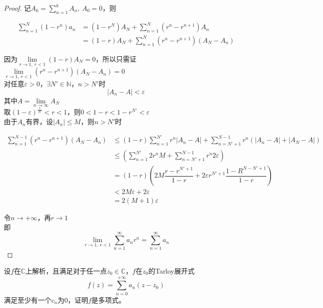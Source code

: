 \begin{proof}
    
    记$A_k = \sum\limits_{n = 1}^{k}{A_n},\ A_0 = 0$，则

    \begin{align*}
        \sum\limits_{n=1}^{N}{(1-r^n)a_n} & = (1-r^N)A_N + \sum\limits_{n=1}^{N}{(r^n-r^{n+1})A_n}\\
        & = (1 - r)A_N + \sum\limits_{n=1}^{N}{(r^n-r^{n+1})(A_N - A_n)}
    \end{align*}

    因为$\lim\limits_{r \to 1,\ r < 1}{(1 - r)A_N} = 0$，所以只需证$\lim\limits_{r \to 1,\ r < 1}{(r^n-r^{n+1})(A_N - A_n)} = 0$\\
    对任意$\varepsilon > 0 $，$\exists N' \in \mathbb{N}$，$n > N'$时
    $$|A_n - A| < \varepsilon $$
    其中$A = \lim\limits_{n\to\infty}{A_N}$\\
    取$(1-\varepsilon)^{\frac{1}{N'}} < r < 1$，则$0 < 1 - r < 1 - r^{N'} < \varepsilon $\\
    由于$A_n$有界，设$|A_n| \leq M $，则$n > N'$时
    
    \begin{align*}
        \sum\limits_{n=1}^{N-1}{(r^n - r^{n+1})(A_N - A_n)} & \leq (1 - r)\sum\limits_{n=1}^{N'}{r^n|A_n - A|} + \sum\limits_{n=N'+1}^{N-1}{r^n(|A_n - A| + |A_N -A|)}\\
        & \leq (\sum\limits_{n=1}^{N'}{2r^nM} + \sum\limits_{n=N'+1}^{N-1}{r^n2\varepsilon})\\
        & = (1 - r)\left(2M\dfrac{r - r^{N'+1}}{1 - r} + 2\varepsilon r^{N'+1}\dfrac{1 - R^{N-N'+1}}{1 - r}\right)\\
        & < 2M\varepsilon + 2\varepsilon\\
        & = 2(M+1)\varepsilon
    \end{align*}

    令$n\to+\infty$，再$r\to1$\\
    即
    $$\lim\limits_{r \to 1,\ r < 1}{\sum\limits_{n=1}^{\infty}{a_nr^n}} = \sum\limits_{n=1}^{\infty}{a_n}$$

\end{proof}

\begin{proposition}
    
    设$f$在$\mathbb{C}$上解析，且满足对于任一点$z_0\in\mathbb{C}$，$f$在$z_0$的\textup{Tarloy}展开式
    $$f(z) = \sum\limits_{n=0}^{+\infty}{a_n(z-z_0)}$$
    满足至少有一个$c_n$为$0$，证明$f$是多项式。

\end{proposition}

